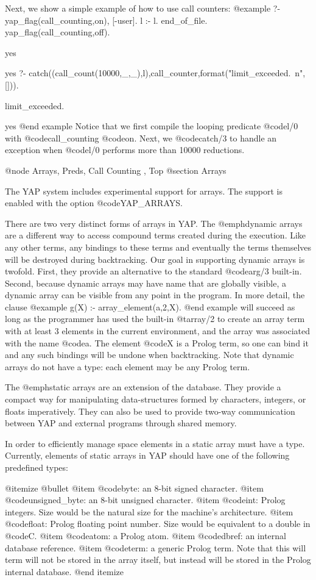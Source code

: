 {{{{{{Next, we show a simple example of how to use call counters:
@example
   ?- yap_flag(call_counting,on), [-user]. l :- l. end_of_file. yap_flag(call_counting,off).

yes

yes
   ?- catch((call_count(10000,_,_),l),call_counter,format("limit_exceeded.~n",[])).

limit_exceeded.

yes
@end example
Notice that we first compile the looping predicate @code{l/0} with
@code{call_counting} @code{on}. Next, we @code{catch/3} to handle an
exception when @code{l/0} performs more than 10000 reductions.


@node Arrays, Preds, Call Counting , Top
@section Arrays

The YAP system includes experimental support for arrays. The
support is enabled with the option @code{YAP_ARRAYS}.

There are two very distinct forms of arrays in YAP. The
@emph{dynamic arrays} are a different way to access compound terms
created during the execution. Like any other terms, any bindings to
these terms and eventually the terms themselves will be destroyed during
backtracking. Our goal in supporting dynamic arrays is twofold. First,
they provide an alternative to the standard @code{arg/3}
built-in. Second, because dynamic arrays may have name that are globally
visible, a dynamic array can be visible from any point in the
program. In more detail, the clause
@example
g(X) :- array_element(a,2,X).
@end example
will succeed as long as the programmer has used the built-in @t{array/2}
to create an array term with at least 3 elements in the current
environment, and the array was associated with the name @code{a}.  The
element @code{X} is a Prolog term, so one can bind it and any such
bindings will be undone when backtracking. Note that dynamic arrays do
not have a type: each element may be any Prolog term.

The @emph{static arrays} are an extension of the database. They provide
a compact way for manipulating data-structures formed by characters,
integers, or floats imperatively. They can also be used to provide
two-way communication between YAP and external programs through
shared memory.

In order to efficiently manage space elements in a static array must
have a type. Currently, elements of static arrays in YAP should
have one of the following predefined types:

@itemize @bullet
@item  @code{byte}: an 8-bit signed character.
@item  @code{unsigned_byte}: an 8-bit unsigned character.
@item  @code{int}: Prolog integers. Size would be the natural size for
the machine's architecture.
@item  @code{float}: Prolog floating point number. Size would be equivalent
to a double in @code{C}.
@item  @code{atom}: a Prolog atom.
@item  @code{dbref}: an internal database reference.
@item  @code{term}: a generic Prolog term. Note that this will term will
not be stored in the array itself, but instead will be stored in the
Prolog internal database.
@end itemize

}}}}}}
